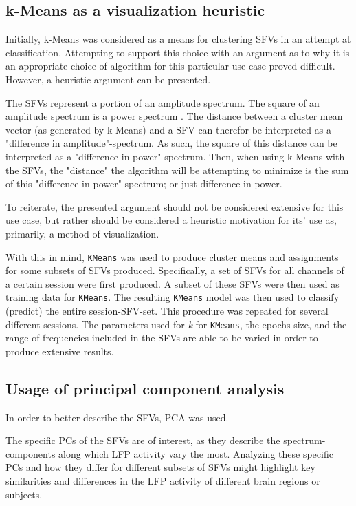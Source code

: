 \documentclass{article}
\begin{document}
\subsection{k-Means as a visualization heuristic}\label{KM Method}
Initially, k-Means was considered as a means for clustering SFVs in an attempt at classification. 
Attempting to support this choice with an argument as to why it is an appropriate choice of algorithm for this particular use case proved difficult.
However, a heuristic argument can be presented.

The SFVs represent a portion of an amplitude spectrum. 
The square of an amplitude spectrum is a power spectrum \citep{numpy}.
The distance between a cluster mean vector (as generated by k-Means) and a SFV can therefor be interpreted as a "difference in amplitude"-spectrum.
As such, the square of this distance can be interpreted as a "difference in power"-spectrum.
Then, when using k-Means with the SFVs, the "distance" the algorithm will be attempting to minimize is the sum of this "difference in power"-spectrum; or just difference in power.

To reiterate, the presented argument should not be considered extensive for this use case, but rather should be considered a heuristic motivation for its' use as, primarily, a method of visualization.

With this in mind, \texttt{KMeans} was used to produce cluster means and assignments for some subsets of SFVs produced.
Specifically, a set of SFVs for all channels of a certain session were first produced.
A subset of these SFVs were then used as training data for \texttt{KMeans}.
The resulting \texttt{KMeans} model was then used to classify (predict) the entire session-SFV-set.
This procedure was repeated for several different sessions.
The parameters used for \textit{k} for \texttt{KMeans}, the epochs size, and the range of frequencies included in the SFVs are able to be varied in order to produce extensive results. 

\subsection{Usage of principal component analysis}\label{PCA Methods}
In order to better describe the SFVs, PCA was used.

The specific PCs of the SFVs are of interest, as they describe the spectrum-components along which LFP activity vary the most.
Analyzing these specific PCs and how they differ for different subsets of SFVs might highlight key similarities and differences in the LFP activity of different brain regions or subjects.
\end{document}
